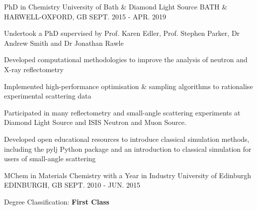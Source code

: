 \begin{cventries}
  \cventry
    {PhD in Chemistry}
    {University of Bath & Diamond Light Source}
    {BATH & HARWELL-OXFORD, GB}
    {SEPT. 2015 - APR. 2019}
    {
      \begin{cvitems}
        \item {Undertook a PhD supervised by Prof. Karen Edler, Prof. Stephen Parker, Dr Andrew Smith and Dr Jonathan Rawle}
        \item {Developed computational methodologies to improve the analysis of neutron and X-ray reflectometry}
        \item {Implemented high-performance optimisation \& sampling algorithms to rationalise experimental scattering data}
        \item {Participated in many reflectometry and small-angle scattering experiments at Diamond Light Source and ISIS Neutron and Muon Source.}
        \item {Developed open educational resources to introduce classical simulation methods, including the pylj Python package and an introduction to classical simulation for users of small-angle scattering}
      \end{cvitems}
    }
  \cventry
    {MChem in Materials Chemistry with a Year in Industry}
    {University of Edinburgh}
    {EDINBURGH, GB}
    {SEPT. 2010 - JUN. 2015}
    {
      \begin{cvitems}
        \item {Degree Classification: \textbf{First Class}}
      \end{cvitems}
    }
\end{cventries}
